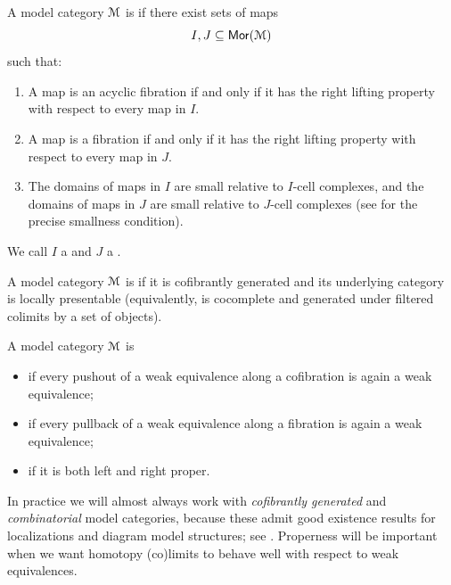 \begin{definition}
  A model category $\mathcal M$ is  if there exist sets
  of maps
  \begin{equation}
    I, J \subseteq \operatorname{\sf Mor}(\mathcal M)
  \end{equation}
  such that:
  \begin{enumerate}
    \item A map is an acyclic fibration if and only if it has the right
          lifting property with respect to every map in \(I\).
    \item A map is a fibration if and only if it has the right lifting
          property with respect to every map in \(J\).
    \item The domains of maps in \(I\) are small relative to \(I\)-cell
          complexes, and the domains of maps in \(J\) are small relative to
          \(J\)-cell complexes (see \cite[Def.~10.1.2]{Hir14} for the precise
          smallness condition).
  \end{enumerate}
  We call \(I\) a  and \(J\) a
  .
\end{definition}

\begin{definition}
  A model category $\mathcal M$ is  if it is cofibrantly
  generated and its underlying category is locally presentable (equivalently,
  is cocomplete and generated under filtered colimits by a set of objects).
\end{definition}

\begin{definition}\label{ch2:: def: proper}
  A model category $\mathcal M$ is
  \begin{itemize}
    \item {} if every pushout of a weak equivalence along a
          cofibration is again a weak equivalence;
    \item {} if every pullback of a weak equivalence along a
          fibration is again a weak equivalence;
    \item {} if it is both left and right proper.
  \end{itemize}
\end{definition}

\begin{remark}
  In practice we will almost always work with \emph{cofibrantly generated} and
  \emph{combinatorial} model categories, because these admit good existence
  results for localizations and diagram model structures; see
  \cite[Ch.~11, Ch.~13]{Hir14}.  Properness will be important when we want
  homotopy (co)limits to behave well with respect to weak equivalences.
\end{remark}

